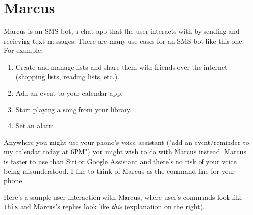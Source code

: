 \documentclass{article}
\newcommand{\user}[1]{\texttt{#1}}
\newcommand{\marcus}[1]{\textit{#1}}
\begin{document}
\section{Marcus}

Marcus is an SMS bot, a chat app that the user interacts with by sending and recieving text messages.
There are many use-cases for an SMS bot like this one.
For example:

\begin{enumerate}
  \item Create and manage lists and share them with friends over the internet (shopping lists, reading lists, etc.).
  \item Add an event to your calendar app.
  \item Start playing a song from your library.
  \item Set an alarm.
\end{enumerate}

Anywhere you might use your phone's voice assistant ("add an event/reminder to my calendar today at 6PM") you might wish to do with Marcus instead.
Marcus is faster to use than Siri or Google Assistant and there's no risk of your voice being misunderstood.
I like to think of Marcus as the command line for your phone.

Here's a sample user interaction with Marcus, where user's commands look like \user{this} and Marcus's replies look like \marcus{this} (explanation on the right).
\end{document}
